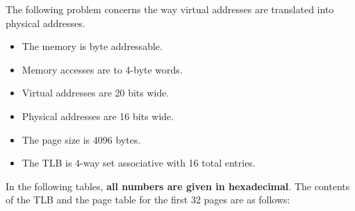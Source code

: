 \begin{problem}{10}

The following problem concerns 
the way virtual addresses are translated into physical addresses.
\end{problem}

\begin{itemize}
\item The memory is byte addressable.
\item Memory accesses are to 4-byte words.
\item Virtual addresses are 20 bits wide.
\item Physical addresses are 16 bits wide.
\item The page size is 4096 bytes.
\item The TLB is 4-way set associative with 16 total entries.
\end{itemize}

In the following tables, {\bf all numbers are given in hexadecimal}.
The contents of the TLB and the page table for the first 32 pages
are as follows:

